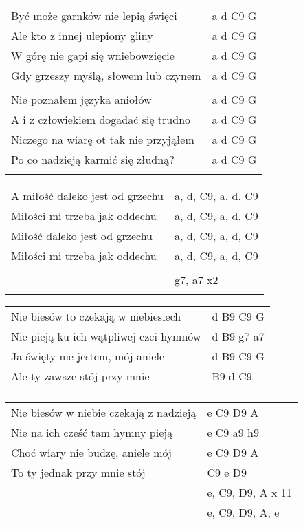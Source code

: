\documentclass[a5paper]{article}
\begin{document}
\noindent
\begin{tabular}{@{}p{8.00cm}p{3cm}@{}}
Być może garnków nie lepią święci & a d C9 G \\
Ale kto z innej ulepiony gliny & a d C9 G \\
W górę nie gapi się wniebowzięcie & a d C9 G \\
Gdy grzeszy myślą, słowem lub czynem & a d C9 G \\ \\

Nie poznałem języka aniołów	& a d C9 G \\
A i z człowiekiem dogadać się trudno & a d C9 G \\
Niczego na wiarę ot tak nie przyjąłem & a d C9 G \\
Po co nadzieją karmić się złudną? & a d C9 G \\ \\
\end{tabular}

\noindent
\begin{tabular}{@{}p{6.00cm}p{3cm}@{}}
A miłość daleko jest od grzechu & a, d, C9, a, d, C9 \\
Miłości mi trzeba jak oddechu & a, d, C9, a, d, C9 \\
Miłość daleko jest od grzechu & a, d, C9, a, d, C9 \\
Miłości mi trzeba jak oddechu & a, d, C9, a, d, C9 \\ \\
& g7, a7 x2 \\ \\
\end{tabular}

\noindent
\begin{tabular}{@{}p{7.00cm}p{3cm}@{}}
Nie biesów to czekają w niebiesiech & d B9 C9 G \\
Nie pieją ku ich wątpliwej czci hymnów & d B9 g7 a7 \\
Ja święty nie jestem, mój aniele & d B9 C9 G \\
Ale ty zawsze stój przy mnie & B9 d C9 \\ \\
\end{tabular}

\noindent
\begin{tabular}{@{}p{7.00cm}p{3cm}@{}}
Nie biesów w niebie czekają z nadzieją & e C9 D9 A \\
Nie na ich cześć tam hymny pieją & e C9 a9 h9 \\
Choć wiary nie budzę, aniele mój & e C9 D9 A \\
To ty jednak przy mnie stój & C9 e D9 \\
& e, C9, D9, A x 11 \\
& e, C9, D9, A, e
\end{tabular}
\end{document}
